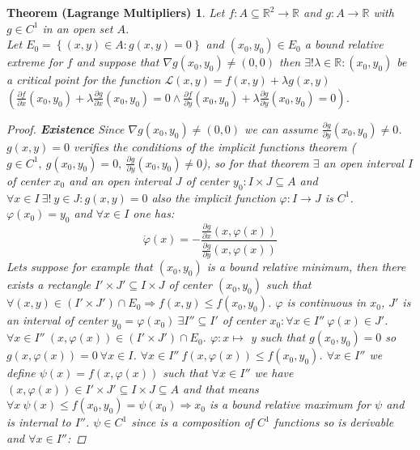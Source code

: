 \documentclass{article}
\newtheorem*{lagrangemult}{Theorem (Lagrange Multipliers)}
\begin{document}
        \begin{lagrangemult}
            Let $f:A\subseteq \mathbb{R}^2 \rightarrow \mathbb{R}$ and $g:A \rightarrow \mathbb{R}$ with $g \in C^1$ in an open set $A$. \\ 
            Let $E_0 = \left\{ (x,y)\in A: g(x,y)= 0 \right\}$ and $(x_0,y_0) \in E_0$ a bound relative extreme for $f$ and suppose that $\nabla g(x_0,y_0) \neq (0,0)$ then $\exists ! \lambda \in \mathbb{R} : (x_0,y_0)$ be a critical point for the function $\mathcal{L} (x,y) = f(x,y) + \lambda g(x,y)$ $\left( \frac{\partial f}{\partial x}(x_0,y_0) + \lambda \frac{\partial g}{\partial x}(x_0,y_0) = 0 \land \frac{\partial f}{\partial y}(x_0,y_0) + \lambda \frac{\partial g}{\partial y}(x_0,y_0) = 0\right)$.
            \begin{proof}
                \textbf{Existence} Since $\nabla g(x_0,y_0) \neq (0,0)$ we can assume $\frac{\partial g}{\partial y}(x_0,y_0) \neq 0$. $g(x,y) = 0$ verifies the conditions of the implicit functions theorem ($g \in C^1, \ g(x_0,y_0) = 0, \ \frac{\partial g}{\partial y}(x_0,y_0) \neq 0$), so for that theorem $\exists$ an open interval $I$ of center $x_0$ and an open interval $J$ of center $y_0: I \times J \subseteq A$ and $\forall x \in I \ \exists ! \ y \in J: g(x,y)=0$ also the implicit function $\varphi : I \rightarrow J$ is $C^1$. $\varphi (x_0) = y_0$ and $\forall x \in I$ one has: 
                \begin{equation*}
                    \dot{\varphi}(x) = - \frac{\frac{\partial g}{\partial x}(x, \varphi (x))}{\frac{\partial g}{\partial y}(x, \varphi (x))}
                \end{equation*} 
                Lets suppose for example that $(x_0,y_0)$ is a bound relative minimum, then there exists a rectangle $I' \times J' \subseteq I \times J$ of center $(x_0,y_0)$ such that $\forall (x,y) \in (I'\times J')\cap E_0 \Rightarrow f(x,y) \leq f(x_0,y_0)$. $\varphi$ is continuous in $x_0$, $J'$ is an interval of center $y_0 = \varphi(x_0) \ \exists  I'' \subseteq I'$ of center $x_0 : \forall x \in I'' \ \varphi(x) \in J'$. $\forall x \in I'' \ (x,\varphi(x)) \in (I' \times J') \cap E_0$. $\varphi :x \longmapsto$ y such that $g(x_0,y_0) = 0$ so $g(x,\varphi(x)) = 0 \ \forall x \in I$. $\forall x \in I'' \ f(x,\varphi(x)) \leq f(x_0,y_0)$. $\forall x \in I''$ we define $\psi(x) = f(x,\varphi(x))$ such that $\forall x \in I''$ we have $(x,\varphi(x)) \in I' \times J' \subseteq I\times J \subseteq A$ and that means $\forall x \ \psi(x) \leq f(x_0,y_0) = \psi(x_0) \Rightarrow x_0$ is a bound relative maximum for $\psi$ and is internal to $I''$. $\psi \in C^1$ since is a composition of $C^1$ functions so is derivable and $\forall x \in I''$:

\end{proof}
\end{lagrangemult}
\end{document}
